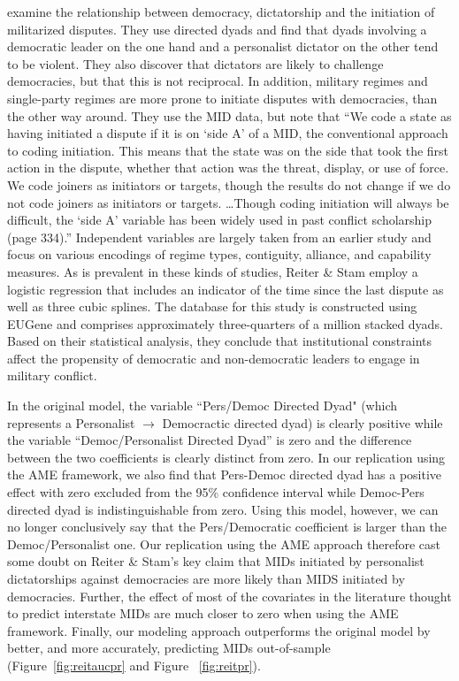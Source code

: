 \citet{reiter:stam:2003} examine the relationship between democracy, dictatorship and the initiation of militarized disputes.  They use directed dyads and find that dyads involving a democratic leader on the one hand and a personalist dictator on the other tend to be violent. They also discover that dictators are likely to challenge democracies, but that this is not reciprocal.  In addition, military regimes and single-party regimes are more prone to initiate disputes with democracies, than the other way around.  They use the MID data, but note that ``We code a state as having initiated a dispute if it is on `side A' of a MID, the conventional approach to coding initiation. This means that the state was on the side that took the first action in the dispute, whether that action was the threat, display, or use of force. We code joiners as initiators or targets, though the results do not change if we do not code joiners as initiators or targets. \ldots Though coding initiation will always be difficult, the `side A' variable has been widely used in past conflict scholarship (page 334).'' Independent variables are largely taken from an earlier study and focus on various encodings of regime types, contiguity, alliance, and capability measures. As is prevalent in these kinds of studies, Reiter \& Stam employ a logistic regression that includes an indicator of the time since the last dispute as well as three cubic splines. The database for this study is constructed using EUGene \citep{bennett:stam:2000} and comprises approximately three-quarters of a million stacked dyads. Based on their statistical analysis, they conclude that institutional constraints affect the propensity of democratic and non-democratic leaders to engage in military conflict. 

In the original model, the variable ``Pers/Democ Directed Dyad" (which represents a Personalist $\rightarrow$ Democractic directed dyad) is clearly positive while the variable ``Democ/Personalist Directed Dyad'' is zero and the difference between the two coefficients is clearly distinct from zero. In our replication using the AME framework, we also find that Pers-Democ directed dyad has a positive effect with zero excluded from the 95\% confidence interval while Democ-Pers directed dyad is indistinguishable from zero. Using this model, however, we can no longer conclusively say that the Pers/Democratic coefficient is larger than the Democ/Personalist one.
Our replication using the AME approach therefore cast some doubt on Reiter \& Stam's key claim that MIDs initiated by personalist dictatorships against democracies are more likely than MIDS initiated by democracies. Further, the effect of most of the covariates in the literature thought to predict interstate MIDs are much closer to zero when using the AME framework. Finally, our modeling approach outperforms the original model by better, and more accurately, predicting MIDs out-of-sample (Figure~\ref{fig:reitaucpr} and Figure ~\ref{fig:reitpr}).  

